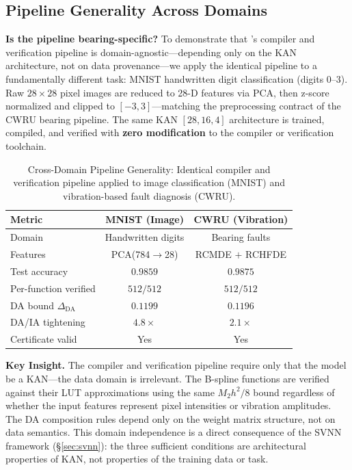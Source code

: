 \subsection{Pipeline Generality Across Domains}
\label{sec:cross_domain}

\noindent\textbf{Is the pipeline bearing-specific?}
To demonstrate that \neuroplc's compiler and verification
pipeline is domain-agnostic---depending only on the KAN
architecture, not on data provenance---we apply the
identical pipeline to a fundamentally different task:
MNIST handwritten digit classification (digits 0--3).
Raw $28\times28$ pixel images are reduced to 28-D
features via PCA, then z-score normalized and clipped
to $[-3,3]$---matching the preprocessing contract of the
CWRU bearing pipeline. The same KAN $[28,16,4]$
architecture is trained, compiled, and verified with
\textbf{zero modification} to the compiler or verification
toolchain.

\begin{table}[ht]
\centering
\caption{Cross-Domain Pipeline Generality: Identical compiler
and verification pipeline applied to image classification
(MNIST) and vibration-based fault diagnosis (CWRU).}
\label{tab:cross_domain}
\begin{tabular}{@{}lcc@{}}
\toprule
\textbf{Metric} & \textbf{MNIST (Image)} & \textbf{CWRU (Vibration)} \\
\midrule
  Domain & Handwritten digits & Bearing faults \\
  Features & PCA(784$\to$28) & RCMDE $+$ RCHFDE \\
  Test accuracy & $0.9859$ & $0.9875$ \\
\midrule
  Per-function verified & $512/512$ & $512/512$ \\
  DA bound $\Delta_{\text{DA}}$ & $0.1199$ & $0.1196$ \\
  DA/IA tightening & $4.8\times$ & $2.1\times$ \\
  Certificate valid & Yes & Yes \\
\bottomrule
\end{tabular}
\end{table}

\textbf{Key Insight.} The compiler and verification
pipeline require only that the model be a KAN---the
data domain is irrelevant. The B-spline functions are
verified against their LUT approximations using the same
$M_2 h^2/8$ bound regardless of whether the input features
represent pixel intensities or vibration amplitudes.
The DA composition rules depend only on the weight matrix
structure, not on data semantics. This domain independence
is a direct consequence of the SVNN framework
({\S}\ref{sec:svnn}): the three sufficient conditions are
architectural properties of KAN, not properties of the
training data or task.
